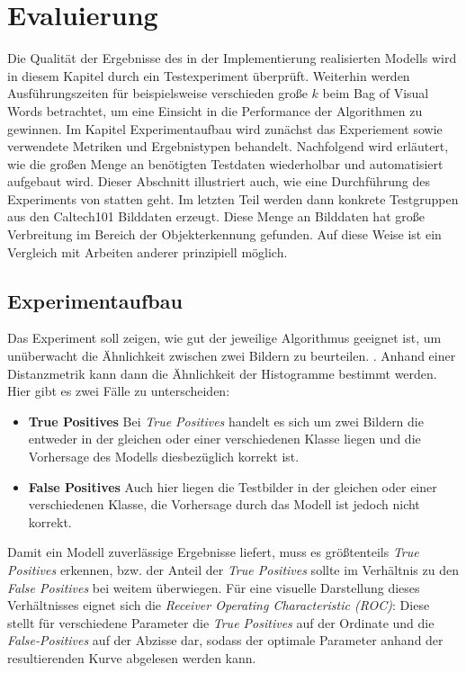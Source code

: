 \chapter{Evaluierung}

Die Qualität der Ergebnisse des in der Implementierung realisierten Modells wird in diesem Kapitel durch ein Testexperiment überprüft. Weiterhin werden Ausführungszeiten für beispielsweise verschieden große $k$ beim Bag of Visual Words betrachtet, um eine Einsicht in die Performance der Algorithmen zu gewinnen.
Im Kapitel Experimentaufbau wird zunächst das Experiement sowie verwendete Metriken und Ergebnistypen behandelt. Nachfolgend wird erläutert, wie die großen Menge an benötigten Testdaten wiederholbar und automatisiert aufgebaut wird. Dieser Abschnitt illustriert auch, wie eine Durchführung des Experiments von statten geht. Im letzten Teil werden dann konkrete Testgruppen aus den Caltech101 \cite{cal2004} Bilddaten erzeugt. Diese Menge an Bilddaten hat große Verbreitung im Bereich der Objekterkennung gefunden. Auf diese Weise ist ein Vergleich mit Arbeiten anderer prinzipiell möglich.

\section{Experimentaufbau}

Das Experiment soll zeigen, wie gut der jeweilige Algorithmus geeignet ist, um unüberwacht die Ähnlichkeit zwischen zwei Bildern zu beurteilen. . Anhand einer Distanzmetrik kann dann die Ähnlichkeit der Histogramme bestimmt werden. Hier gibt es zwei Fälle zu unterscheiden:

\begin{itemize}
	\item \textbf{True Positives} Bei \textit{True Positives} handelt es sich um zwei Bildern die entweder in der gleichen oder einer verschiedenen Klasse liegen und die Vorhersage des Modells diesbezüglich korrekt ist.
	\item \textbf{False Positives} Auch hier liegen die Testbilder in der gleichen oder einer verschiedenen Klasse, die Vorhersage durch das Modell ist jedoch nicht korrekt.
\end{itemize}

Damit ein Modell zuverlässige Ergebnisse liefert, muss es größtenteils \textit{True Positives} erkennen, bzw. der Anteil der \textit{True Positives} sollte im Verhältnis zu den \textit{False Positives} bei weitem überwiegen. Für eine visuelle Darstellung dieses Verhältnisses eignet sich die \textit{Receiver Operating Characteristic (ROC)}: Diese stellt für verschiedene Parameter die \textit{True Positives} auf der Ordinate und die \textit{False-Positives} auf der Abzisse dar, sodass der optimale Parameter anhand der resultierenden Kurve abgelesen werden kann.

